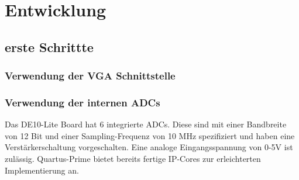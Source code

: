 \section{Entwicklung}
\subsection{erste Schrittte}
\subsubsection{Verwendung der VGA Schnittstelle}
\subsubsection{Verwendung der internen ADCs}
Das DE10-Lite Board hat 6 integrierte ADCs. Diese sind mit einer Bandbreite von 12 Bit und einer Sampling-Frequenz von 10 MHz spezifiziert und haben eine Verstärkerschaltung vorgeschalten. Eine analoge Eingangsspannung von 0-5V ist zulässig. Quartus-Prime bietet bereits fertige IP-Cores zur erleichterten Implementierung an.
 
